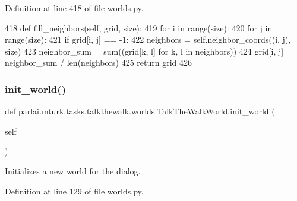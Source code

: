 Definition at line 418 of file worlds.\+py.


\begin{DoxyCode}
418     \textcolor{keyword}{def }fill\_neighbors(self, grid, size):
419         \textcolor{keywordflow}{for} i \textcolor{keywordflow}{in} range(size):
420             \textcolor{keywordflow}{for} j \textcolor{keywordflow}{in} range(size):
421                 \textcolor{keywordflow}{if} grid[i, j] == -1:
422                     neighbors = self.neighbor\_coords((i, j), size)
423                     neighbor\_sum = sum((grid[k, l] \textcolor{keywordflow}{for} k, l \textcolor{keywordflow}{in} neighbors))
424                     grid[i, j] = neighbor\_sum / len(neighbors)
425         \textcolor{keywordflow}{return} grid
426 
\end{DoxyCode}
\mbox{\label{classparlai_1_1mturk_1_1tasks_1_1talkthewalk_1_1worlds_1_1TalkTheWalkWorld_a7a4766cb7ac6f67586387a87c5c3023b}} 
\subsubsection{\texorpdfstring{init\+\_\+world()}{init\_world()}}
{\footnotesize\ttfamily def parlai.\+mturk.\+tasks.\+talkthewalk.\+worlds.\+Talk\+The\+Walk\+World.\+init\+\_\+world (\begin{DoxyParamCaption}\item[{}]{self }\end{DoxyParamCaption})}

\begin{DoxyVerb}Initializes a new world for the dialog.
\end{DoxyVerb}
 

Definition at line 129 of file worlds.\+py.



